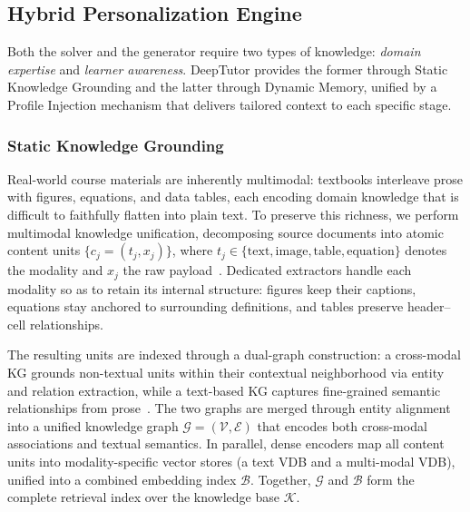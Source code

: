 \subsection{Hybrid Personalization Engine}
\label{sec:personalization}

Both the solver and the generator require two types of knowledge: \emph{domain expertise} and \emph{learner awareness}. DeepTutor provides the former through Static Knowledge Grounding and the latter through Dynamic Memory, unified by a Profile Injection mechanism that delivers tailored context to each specific stage.

\subsubsection{Static Knowledge Grounding}
\label{sec:rag}

Real-world course materials are inherently multimodal: textbooks interleave prose with figures, equations, and data tables, each encoding domain knowledge that is difficult to faithfully flatten into plain text.
To preserve this richness, we perform multimodal knowledge unification, decomposing source documents into atomic content units $\{c_j=(t_j, x_j)\}$, where $t_j\!\in\!\{\text{text}, \text{image}, \text{table}, \text{equation}\}$ denotes the modality and $x_j$ the raw payload~\cite{wang2024mineruopensourcesolutionprecise}.
Dedicated extractors handle each modality so as to retain its internal structure: figures keep their captions, equations stay anchored to surrounding definitions, and tables preserve header--cell relationships.

The resulting units are indexed through a dual-graph construction: a cross-modal KG grounds non-textual units within their contextual neighborhood via entity and relation extraction, while a text-based KG captures fine-grained semantic relationships from prose~\cite{guo2025raganythingallinoneragframework}.
The two graphs are merged through entity alignment into a unified knowledge graph $\mathcal{G}=(\mathcal{V},\mathcal{E})$ that encodes both cross-modal associations and textual semantics.
In parallel, dense encoders map all content units into modality-specific vector stores (a text VDB and a multi-modal VDB), unified into a combined embedding index $\mathcal{B}$.
Together, $\mathcal{G}$ and $\mathcal{B}$ form the complete retrieval index over the knowledge base $\mathcal{K}$.

